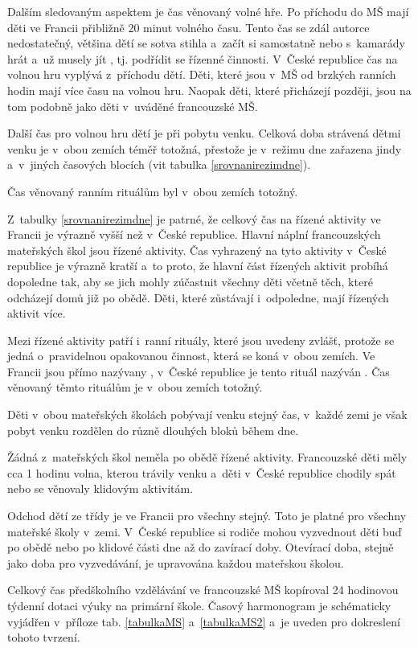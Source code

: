 	Dalším sledovaným aspektem je čas věnovaný volné hře. Po příchodu do MŠ mají děti ve Francii přibližně 20 minut volného času. Tento čas se zdál autorce nedostatečný, většina dětí se sotva stihla  a~začít si samostatně nebo s~kamarády hrát a~už musely jít , tj. podřídit se řízenné činnosti. V~České republice čas na volnou hru vyplývá z~příchodu dětí. Děti, které jsou v~MŠ od brzkých ranních hodin mají více času na volnou hru. Naopak děti, které přicházejí později, jsou na tom podobně jako děti v~uváděné francouzské MŠ. 

	Další čas pro volnou hru dětí je při pobytu venku. Celková doba strávená dětmi venku je v~obou zemích téměř totožná, přestože je v~režimu dne zařazena jindy a~v~jiných časových blocích (vit tabulka \ref{srovnanirezimdne}).

	Čas věnovaný ranním rituálům byl v~obou zemích totožný. 

	Z~tabulky \ref{srovnanirezimdne} je patrné, že celkový čas na řízené aktivity ve Francii je výrazně vyšší než v~České republice. Hlavní náplní francouzských mateřských škol jsou řízené aktivity. Čas vyhrazený na tyto aktivity v~České republice je výrazně kratší a~to proto, že hlavní část řízených aktivit probíhá dopoledne tak, aby se jich mohly zúčastnit všechny děti včetně těch, které odcházejí domů již po obědě. Děti, které zůstávají i~odpoledne, mají řízených aktivit více. 

	Mezi řízené aktivity patří i~ranní rituály, které jsou uvedeny zvlášť, protože se jedná o~pravidelnou opakovanou činnost, která se koná v~obou zemích. Ve Francii jsou přímo nazývany , v~České republice je tento rituál nazýván . Čas věnovaný těmto rituálům je v~obou zemích totožný.

	Děti v~obou mateřských školách pobývají venku stejný čas, v~každé zemi je však pobyt venku rozdělen do různě dlouhých bloků během dne. 

	Žádná z~mateřských škol neměla po obědě řízené aktivity. Francouzské děti měly cca 1 hodinu volna, kterou trávily venku a~děti v~České republice chodily spát nebo se věnovaly klidovým aktivitám. 

	Odchod dětí ze třídy je ve Francii pro všechny stejný. Toto je platné pro všechny mateřské školy v~zemi. V~České republice si rodiče mohou vyzvednout děti buď po obědě nebo po klidové části dne až do zavírací doby. Otevírací doba, stejně jako doba pro vyzvedávání, je upravována každou mateřskou školou.

	Celkový čas předškolního vzdělávání ve francouzské MŠ kopíroval 24 hodinovou týdenní dotaci výuky na primární škole. Časový harmonogram je schématicky vyjádřen v~příloze tab. \ref{tabulkaMS} a~\ref{tabulkaMS2} a~je uveden pro dokreslení tohoto tvrzení.

